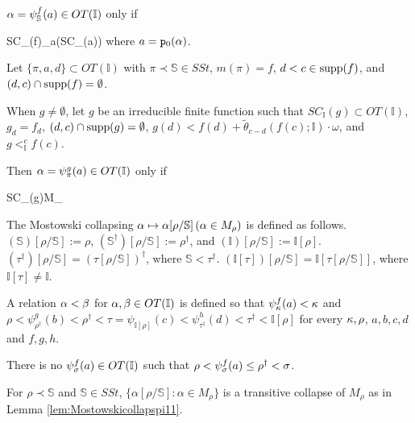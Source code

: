\documentclass{article}
\newcommand{\mS}{\mathbb{S}}
\newcommand{\mI}{\mathbb{I}}
\newcommand{\supp}{{\rm supp}}
\begin{document}
   
 

$\alp=\psi_{\mS}^{f}(a)\in OT(\mI)$ only if

\beqn\label{eq:notationsystem.112.4}
SC_{\mI}(f)\subset {}_{a}(SC_{\mI}(a))
\eeqn
where 
$a={\tt p}_{0}(\alpha)$.









Let
$\{\pi,a,d\}\subset  OT(\mI)$ with
$\pi\prec\mS\in SSt$, 
$m(\pi)=f$,
 $d<c\in \supp(f)$,
and $(d,c)\cap \supp(f)=\emptyset$.

When $g\neq\emptyset$, let
$g$
be an irreducible finite function 
 such that 
$SC_{\mI}(g)\subset OT(\mI)$,
$g_{d}=f_{d}$, $(d,c)\cap \supp(g)=\emptyset$,
$g(d)<f(d)+\tilde{\theta}_{c-d}(f(c); \mI)\cdot\omega$, 
and $g<_{\mI}^{c}f(c)$.


 
Then
$\alp=\psi_{\pi}^{g}(a)\in OT(\mI)$  only if 

\beqn\label{eq:notationsystem.111}
SC_{\mI}(g)\subset M_{\alp}
\eeqn














The Mostowski collapsing $\alp\mapsto\alp[\rho/\mS]\, (\alp\in M_{\rho})$ is defined as follows.
$(\mS)[\rho/\mS]:=\rho$, $(\mS^{\dagger})[\rho/\mS]:=\rho^{\dagger}$, and
$(\mathbb{I})[\rho/\mS]:=\mathbb{I}[\rho]$.
$(\tau^{\dagger})[\rho/\mS]=(\tau[\rho/\mS])^{\dagger}$,
where $\mS<\tau^{\dagger}$.
$(\mI[\tau])[\rho/\mS]=\mI[\tau[\rho/\mS]]$, where $\mI[\tau]\neq\mI$.








A relation $\alpha<\beta$ for $\alp,\bet\in OT(\mI)$ is defined so that
$\psi_{\kappa}^{f}(a)<\kappa$ and 
$\rho<\psi_{\rho^{\dagger}}^{g}(b)<\rho^{\dagger}<\tau=\psi_{\mI[\rho]}(c)<
\psi_{\tau^{\dagger}}^{h}(d)<\tau^{\dagger}<\mI[\rho]$
for every $\kappa,\rho$, $a,b,c,d$ and $f,g,h$.



\bprp\label{prp:jumpover}

There is no $\psi_{\sig}^{f}(a)\in OT(\mI)$ such that
 $\rho<\psi_{\sigma}^{f}(a)\leq\rho^{\dagger}<\sigma$.
\eprp




\blem\label{lem:Mostowskicollaps}
For $\rho\prec\mS$ and $\mS\in SSt$,
$\{\alpha[\rho/\mS]:\alpha\in M_{\rho}\}$ is a transitive collapse of $M_{\rho}$ as in Lemma \ref{lem:Mostowskicollapspi11}.
\elem
\end{document}
